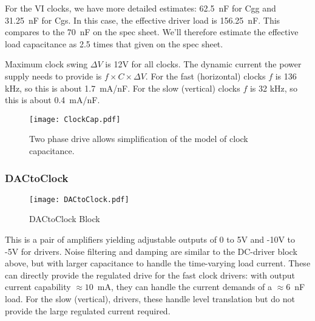 \documentclass[a4paper,12pt]{article}
\begin{document}
For the VI clocks, we have more detailed estimates: 62.5\ nF for Cgg and 31.25\ nF for Cgs. In this case, the effective driver load is 156.25\ nF. This compares to the 70\ nF on the spec sheet. We'll therefore estimate the effective load capacitance as 2.5 times that given on the spec sheet.

Maximum clock swing $\Delta V$ is 12V for all clocks. The dynamic current the power supply needs to provide is $f\times C \times \Delta V$. For the fast (horizontal) clocks $f$ is 136 kHz, so this is about 1.7\ mA/nF. For the slow (vertical) clocks $f$ is 32 kHz, so this is about 0.4\ mA/nF.

   \begin{figure}[h]
   \begin{center}
   \texttt{[image: ClockCap.pdf]}
   \caption{Two phase drive allows simplification of the model of clock capacitance.}
   \label{ClockCap}
   \end{center}
   \end{figure}

\subsubsection{DACtoClock}

   \begin{figure}
   \begin{center}
   \texttt{[image: DACtoClock.pdf]}
   \end{center}
   \caption{DACtoClock Block}
   \end{figure}


This is a pair of amplifiers yielding adjustable outputs of 0 to 5V and -10V to -5V for drivers. Noise filtering and damping are similar to the DC-driver block above, but with larger capacitance to handle the time-varying load current. These can directly provide the regulated drive for the fast clock drivers: with output current capability $\approx 10$\ mA, they can handle the current demands of a $\approx 6$\ nF load. For the slow (vertical), drivers, these handle level translation but do not provide the large regulated current required.
\end{document}
